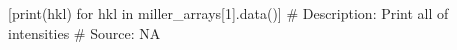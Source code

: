[print(hkl) for hkl in miller_arrays[1].data()]
# Description:  Print all of intensities
# Source:  NA

